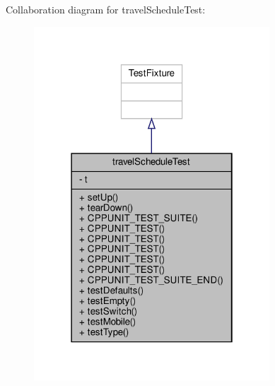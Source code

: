 Collaboration diagram for travel\+Schedule\+Test\+:\nopagebreak
\begin{figure}[H]
\begin{center}
\leavevmode
\includegraphics[width=250pt]{classtravelScheduleTest__coll__graph}
\end{center}
\end{figure}
